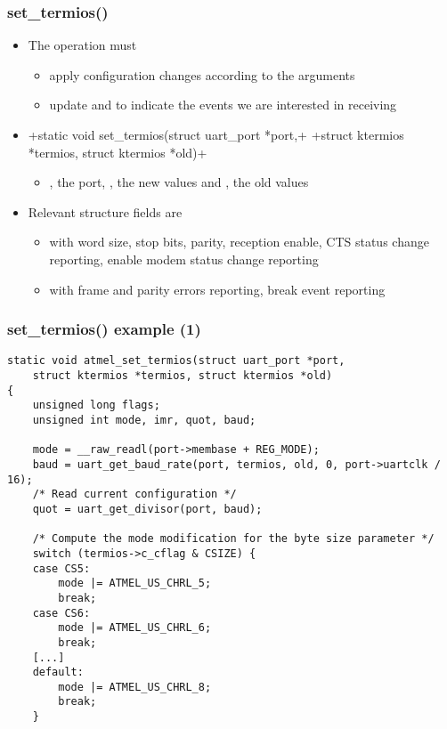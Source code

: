 \begin{frame}[fragile]
  \frametitle{set\_termios()}
  \begin{itemize}
  \item The  operation must
    \begin{itemize}
    \item apply configuration changes according to the arguments
    \item update  and
       to indicate the events we are
      interested in receiving
    \end{itemize}
  \item {}+static void set_termios(struct uart_port *port,+
    +struct ktermios *termios, struct ktermios *old)+
    \begin{itemize}
    \item {}, the port, , the new values and
      , the old values
    \end{itemize}
  \item Relevant  structure fields are
    \begin{itemize}
    \item {} with word size, stop bits, parity, reception
      enable, CTS status change reporting, enable modem status change
      reporting
    \item {} with frame and parity errors reporting, break
      event reporting
    \end{itemize}
  \end{itemize}
\end{frame}

\begin{frame}[fragile]
  \frametitle{set\_termios() example (1)}
\begin{verbatim}
static void atmel_set_termios(struct uart_port *port,
    struct ktermios *termios, struct ktermios *old)
{
    unsigned long flags;
    unsigned int mode, imr, quot, baud;

    mode = __raw_readl(port->membase + REG_MODE);
    baud = uart_get_baud_rate(port, termios, old, 0, port->uartclk / 16);
    /* Read current configuration */
    quot = uart_get_divisor(port, baud);

    /* Compute the mode modification for the byte size parameter */
    switch (termios->c_cflag & CSIZE) {
    case CS5:
        mode |= ATMEL_US_CHRL_5;
        break;
    case CS6:
        mode |= ATMEL_US_CHRL_6;
        break;
    [...]
    default:
        mode |= ATMEL_US_CHRL_8;
        break;
    }
\end{verbatim}
\end{frame}

